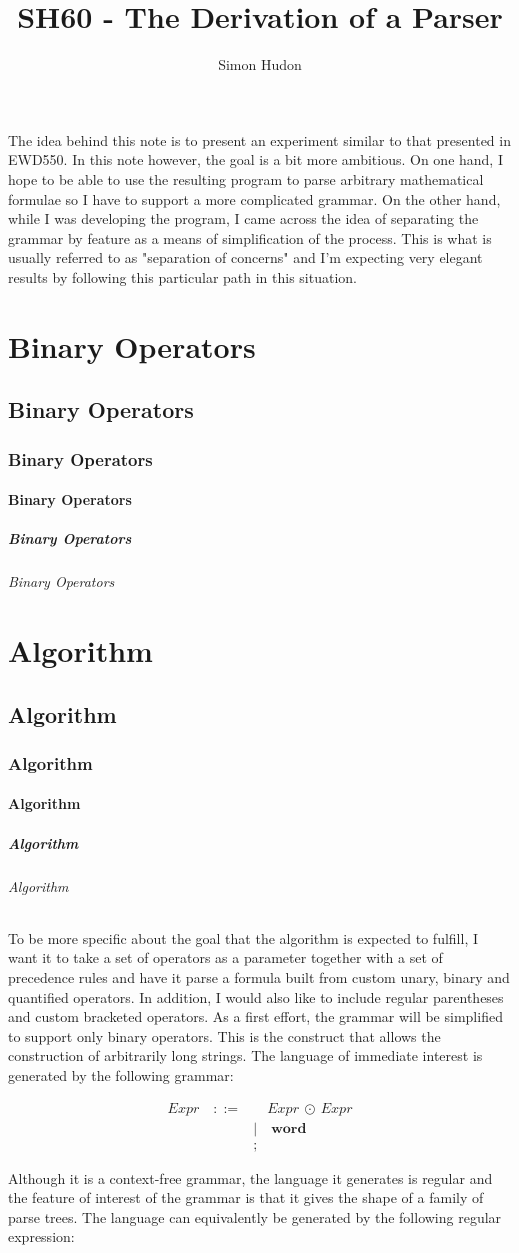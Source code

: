\documentclass[10pt]{report}
\title{SH60 - The Derivation of a Parser}
\author{Simon Hudon}
\newcommand{\word}{\textbf{word}}
\newcounter{i}
\newcommand{\division}[2]{
	\setcounter{i}{1}
	\ifthenelse{#1 = \value{i}} {
		\chapter{#2}
	} {}
	\stepcounter{i}
	\ifthenelse{#1 = \value{i}} {
		\section{#2}
	} {}
	\stepcounter{i}
	\ifthenelse{#1 = \value{i}} {
		\subsection{#2}
	} {}
	\stepcounter{i}
	\ifthenelse{#1 = \value{i}} {
		\subsubsection{#2}
	} {}
	\stepcounter{i}
	\ifthenelse{#1 = \value{i}} {
		\paragraph{#2}
	} {}
	\stepcounter{i}
	\ifthenelse{#1 = \value{i}} {
		\subparagraph{#2}
	} {}
	\stepcounter{i}
}
\begin{document}
\maketitle

The idea behind this note is to present an experiment similar to that presented in EWD550.  In this note however, the goal is a bit more ambitious.  On one hand, I hope to be able to use the resulting program to parse arbitrary mathematical formulae so I have to support a more complicated grammar.  On the other hand, while I was developing the program, I came across the idea of separating the grammar by feature as a means of simplification of the process.  This is what is usually referred to as "separation of concerns" and I'm expecting very elegant results by following this particular path in this situation.

\division{1}{Binary Operators}

\division{2}{Algorithm}

To be more specific about the goal that the algorithm is expected to fulfill, I want it to take a set of operators as a parameter together with a set of precedence rules and have it parse a formula built from custom unary, binary and quantified operators.  In addition, I would also like to include regular parentheses and custom bracketed operators.  As a first effort, the grammar will be simplified to support only binary operators.  This is the construct that allows the construction of arbitrarily long strings.  The language of immediate interest is generated by the following grammar:

\begin{align}
	Expr \quad ::= & \quad Expr  \ \odot \ Expr  \label{csyntax} \\
		& | \quad \word \nonumber \\
		& \nonumber ;
\end{align}

Although it is a context-free grammar, the language it generates is regular and the feature of interest of the grammar is that it gives the shape of a family of parse trees.  The language can equivalently be generated by the following regular expression:
\end{document}
